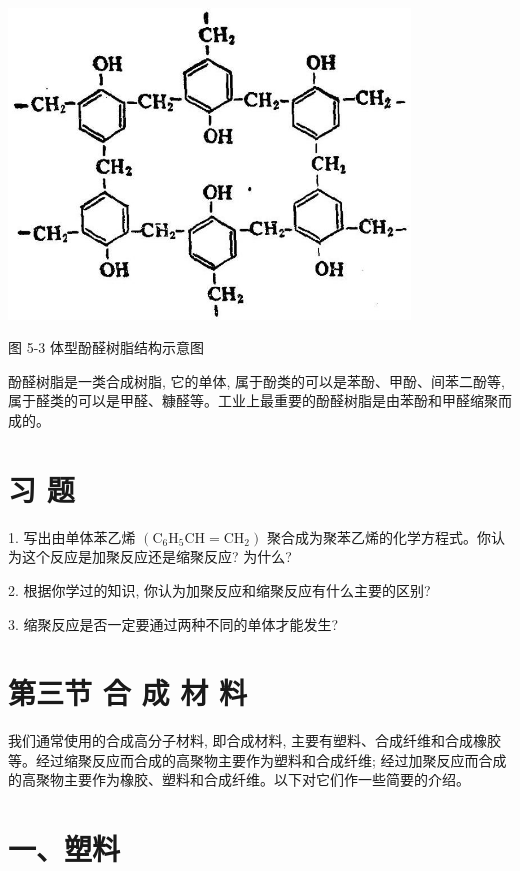 \documentclass[10pt]{article}
\begin{document}
\begin{center}
\includegraphics[max width=0.8\textwidth]{images/01912d16-be99-77bb-9535-4f3ed8d9946f_190_373564.jpg}
\end{center}

图 5-3 体型酚醛树脂结构示意图

酚醛树脂是一类合成树脂, 它的单体, 属于酚类的可以是苯酚、甲酚、间苯二酚等, 属于醛类的可以是甲醛、糠醛等。工业上最重要的酚醛树脂是由苯酚和甲醛缩聚而成的。

\section*{习 题}

1. 写出由单体苯乙烯 \(\left( {{\mathrm{C}}_{6}{\mathrm{H}}_{5}\mathrm{{CH}} = {\mathrm{{CH}}}_{2}}\right)\) 聚合成为聚苯乙烯的化学方程式。你认为这个反应是加聚反应还是缩聚反应? 为什么?

2. 根据你学过的知识, 你认为加聚反应和缩聚反应有什么主要的区别?

3. 缩聚反应是否一定要通过两种不同的单体才能发生?

\section*{第三节 合 成 材 料}

我们通常使用的合成高分子材料, 即合成材料, 主要有塑料、合成纤维和合成橡胶等。经过缩聚反应而合成的高聚物主要作为塑料和合成纤维; 经过加聚反应而合成的高聚物主要作为橡胶、塑料和合成纤维。以下对它们作一些简要的介绍。

\section*{一、塑料}
\end{document}
